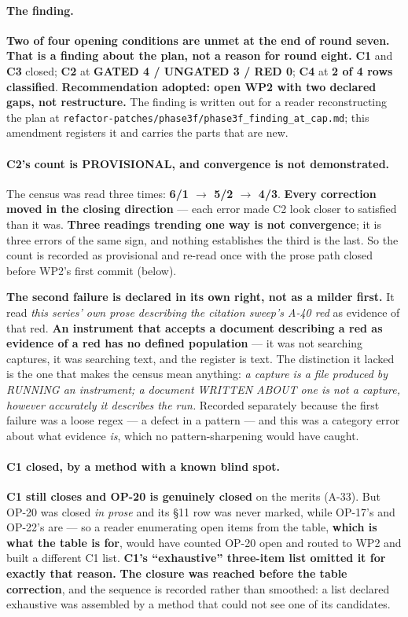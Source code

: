 \documentclass[
  10pt,
]{article}
\begin{document}
\paragraph{The finding.}
\textbf{Two of four opening conditions are unmet at the end of round seven. That is a finding about the plan, not a reason for round eight.} \textbf{C1} and \textbf{C3} closed; \textbf{C2} at \textbf{GATED 4 / UNGATED 3 / RED 0}; \textbf{C4} at \textbf{2 of 4 rows classified}. \textbf{Recommendation adopted: open WP2 with two declared gaps, not restructure.} The finding is written out for a reader reconstructing the plan at \texttt{refactor-patches/\allowbreak{}phase3f/\allowbreak{}phase3f\_finding\_at\_cap.md}; this amendment registers it and carries the parts that are new.

\paragraph{C2's count is PROVISIONAL, and convergence is not demonstrated.}
The census was read three times: \textbf{6/1 $\rightarrow$ 5/2 $\rightarrow$ 4/3}. \textbf{Every correction moved in the closing direction} --- each error made C2 look closer to satisfied than it was. \textbf{Three readings trending one way is not convergence}; it is three errors of the same sign, and nothing establishes the third is the last. So the count is recorded as provisional and re-read once with the prose path closed before WP2's first commit (below).

\textbf{The second failure is declared in its own right, not as a milder first.} It read \emph{this series' own prose describing the citation sweep's A-40 red} as evidence of that red. \textbf{An instrument that accepts a document describing a red as evidence of a red has no defined population} --- it was not searching captures, it was searching text, and the register is text. The distinction it lacked is the one that makes the census mean anything: \emph{a capture is a file produced by RUNNING an instrument; a document WRITTEN ABOUT one is not a capture, however accurately it describes the run.} Recorded separately because the first failure was a loose regex --- a defect in a pattern --- and this was a category error about what evidence \emph{is}, which no pattern-sharpening would have caught.

\paragraph{C1 closed, by a method with a known blind spot.}
\textbf{C1 still closes and OP-20 is genuinely closed} on the merits (A-33). But OP-20 was closed \emph{in prose} and its \S11 row was never marked, while OP-17's and OP-22's are --- so a reader enumerating open items from the table, \textbf{which is what the table is for}, would have counted OP-20 open and routed to WP2 and built a different C1 list. \textbf{C1's ``exhaustive'' three-item list omitted it for exactly that reason.} \textbf{The closure was reached before the table correction}, and the sequence is recorded rather than smoothed: a list declared exhaustive was assembled by a method that could not see one of its candidates.
\end{document}
